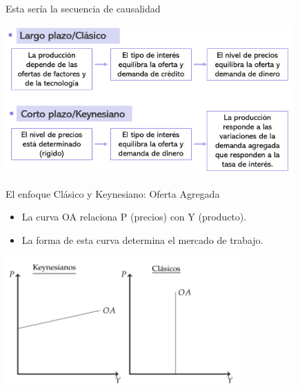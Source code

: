 \documentclass{beamer}
\begin{document}
\begin{frame}{Esta sería la secuencia de causalidad}

\centering\includegraphics[width=11cm]{../Figures/P18.png}\

\end{frame}


\begin{frame}{El enfoque Clásico y Keynesiano: Oferta Agregada}
    \begin{itemize}
            \item La curva OA relaciona P (precios) con Y (producto).
            \item La forma de esta curva determina el mercado de trabajo.
    \end{itemize}
    \centering\includegraphics[width=9cm]{../Figures/C33.3.png}
\end{frame}
\end{document}
